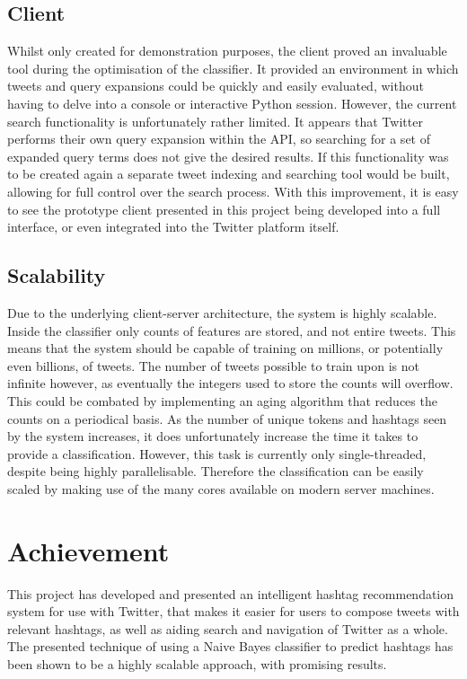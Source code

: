 \documentclass[11pt,a4paper]{report}
\begin{document}
\subsection{Client}
Whilst only created for demonstration purposes, the client proved an invaluable tool during the optimisation of the classifier. It provided an environment in which tweets and query expansions could be quickly and easily evaluated, without having to delve into a console or interactive Python session. However, the current search functionality is unfortunately rather limited. It appears that Twitter performs their own query expansion within the API, so searching for a set of expanded query terms does not give the desired results. If this functionality was to be created again a separate tweet indexing and searching tool would be built, allowing for full control over the search process. With this improvement, it is easy to see the prototype client presented in this project being developed into a full interface, or even integrated into the Twitter platform itself.

\subsection{Scalability}
Due to the underlying client-server architecture, the system is highly scalable. Inside the classifier only counts of features are stored, and not entire tweets. This means that the system should be capable of training on millions, or potentially even billions, of tweets. The number of tweets possible to train upon is not infinite however, as eventually the integers used to store the counts will overflow. This could be combated by implementing an aging algorithm that reduces the counts on a periodical basis. As the number of unique tokens and hashtags seen by the system increases, it does unfortunately increase the time it takes to provide a classification. However, this task is currently only single-threaded, despite being highly parallelisable. Therefore the classification can be easily scaled by making use of the many cores available on modern server machines.

\section{Achievement}
This project has developed and presented an intelligent hashtag recommendation system for use with Twitter, that makes it easier for users to compose tweets with relevant hashtags, as well as aiding search and navigation of Twitter as a whole. The presented technique of using a Naive Bayes classifier to predict hashtags has been shown to be a highly scalable approach, with promising results.
\end{document}
